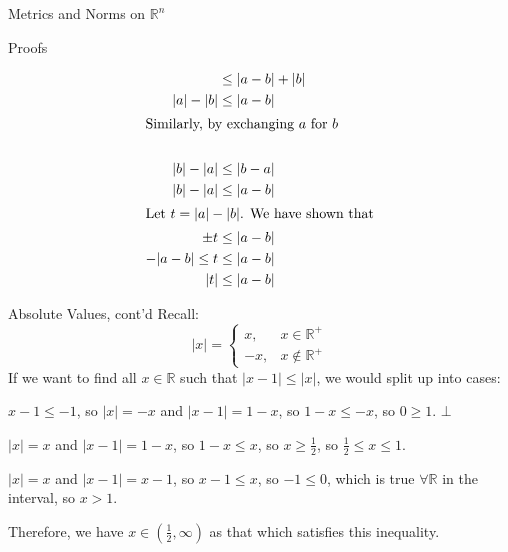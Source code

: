 \documentclass[10pt]{extarticle}
\newcommand{\R}{\mathbb{R}}
\begin{document}
\begin{problem}{Metrics and Norms on $\R^n$}
\begin{problem}{Proofs}
\begin{description}[font=\normalfont]
\begin{align*}
                &\leq |a-b| + |b| \\
            |a| - |b| &\leq |a-b|\\
            \shortintertext{Similarly, by exchanging $a$ for $b$}\\
            |b| - |a| &\leq |b-a|\\
            |b| - |a| &\leq |a-b|\\
            \shortintertext{Let $t = |a| - |b|$. We have shown that}
            \pm t &\leq |a-b|\\
            -|a-b| \leq t &\leq |a-b|\\
            |t| &\leq |a-b|
          \end{align*}
      \end{description}
    \end{problem}
  \end{problem}
  \begin{problem}{Absolute Values, cont'd}
    Recall:
    \[
      |x| = \begin{cases}
        x,&x\in\R^+\\
        -x,&x\notin \R^+
      \end{cases}
    \] 
    If we want to find all $x\in\R$ such that $|x-1| \leq |x|$, we would split up into cases:
    \begin{description}[font=\normalfont]
      \item[$x\leq 0$] $x-1 \leq -1$, so $|x| = -x$ and $|x-1| = 1-x$, so $1-x \leq -x$, so $0 \geq 1$. $\bot$
      \item[$0 < x \leq 1$] $|x| = x$ and $|x-1| = 1-x$, so $1-x \leq x$, so $x \geq \frac{1}{2}$, so $\frac{1}{2} \leq x \leq 1$.
      \item[$1 < x$] $|x| = x$ and $|x-1| = x-1$, so $x-1 \leq x$, so $-1 \leq 0$, which is true $\forall \R$ in the interval, so $x > 1$.
    \end{description}
    Therefore, we have $x\in \left(\frac{1}{2},\infty\right)$ as that which satisfies this inequality.
  \end{problem}
\end{document}
